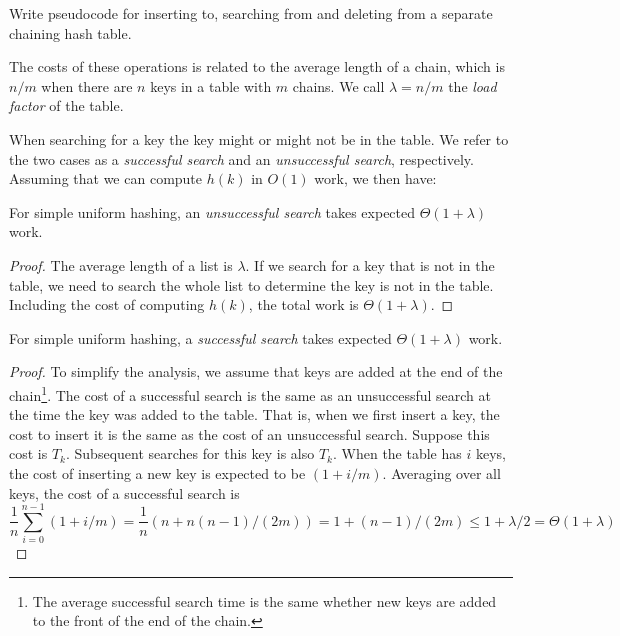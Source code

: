 \begin{exercise}
Write pseudocode for inserting to, searching from and deleting from a
separate chaining hash table.
\end{exercise}

The costs of these operations is related to the average length of a
chain, which is $n/m$ when there are $n$ keys in a table with $m$
chains. We call $\lambda = n/m$ the \emph{load factor} of the table.

When searching for a key the key might or might not be in the table.
We refer to the two cases as a \emph{successful search} and an
\emph{unsuccessful search}, respectively.  Assuming that
we can compute $h(k)$ in $O(1)$ work, we then have:

\begin{claim} 
For simple uniform hashing, an \emph{unsuccessful search} takes
expected $\Theta(1 + \lambda)$ work.

\begin{proof} The average length of a list is $\lambda$.  If we search
  for a key that is not in the table, we need to search the whole list
  to determine the key is not in the table.  Including the cost of
  computing $h(k)$, the total work is $\Theta(1 + \lambda)$.
\end{proof}
\end{claim}

\begin{claim} For 
simple uniform hashing, a \emph{successful search}
takes expected $\Theta(1 + \lambda)$ work.

\begin{proof} 
To simplify the analysis, we assume that keys are added at the end of
the chain\footnote{The average successful search time is the same
  whether new keys are added to the front of the end of the
  chain.}. The cost of a successful search is the same as an
unsuccessful search at the time the key was added to the table.  That
is, when we first insert a key, the cost to insert it is the same as
the cost of an unsuccessful search.  Suppose this cost is $T_k$.
Subsequent searches for this key is also $T_k$.  When the table has
$i$ keys, the cost of inserting a new key is expected to be $(1 +
i/m)$.  Averaging over all keys, the cost of a successful search is
\[\frac1{n} \sum_{i=0}^{n-1} (1 + i/m) = \frac1n(n+n(n-1)/(2m)) = 1 + (n-1)/(2m) \leq 1 + \lambda/2
= \Theta(1+\lambda) \]
\end{proof}
\end{claim}

